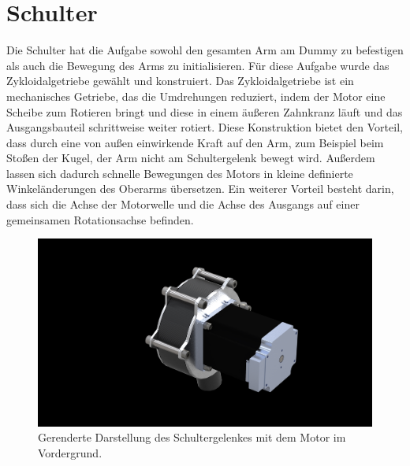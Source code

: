 	\section{Schulter}
		Die Schulter hat die Aufgabe sowohl den gesamten Arm am Dummy zu befestigen als auch die Bewegung des Arms zu initialisieren.
		Für diese Aufgabe wurde das Zykloidalgetriebe gewählt und konstruiert.
		Das Zykloidalgetriebe ist ein mechanisches Getriebe, das die Umdrehungen reduziert, indem der Motor eine Scheibe zum Rotieren bringt und diese in einem äußeren Zahnkranz läuft und das Ausgangsbauteil schrittweise weiter rotiert.
		Diese Konstruktion bietet den Vorteil, dass durch eine von außen einwirkende Kraft auf den Arm, zum Beispiel beim Stoßen der Kugel, der Arm nicht am Schultergelenk bewegt wird.
		Außerdem lassen sich dadurch schnelle Bewegungen des Motors in kleine definierte Winkeländerungen des Oberarms übersetzen.
		Ein weiterer Vorteil besteht darin, dass sich die Achse der Motorwelle und die Achse des Ausgangs auf einer gemeinsamen Rotationsachse befinden.
		\begin{figure}[h]
			\centering
			\includegraphics[width=\textwidth]{Abb/CAD/Renderings/Effektor.jpg}
			\caption[Gerenderte Darstellung des Schultergelenkes]{Gerenderte Darstellung des Schultergelenkes mit dem Motor im Vordergrund.}%
			\label{fig:rendering effektor}
		\end{figure}

	
